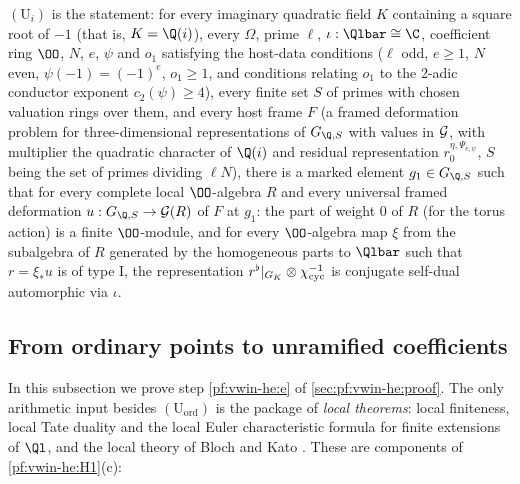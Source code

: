 \begin{definition}\label{pf:modularity:Ui}
$(\mathrm{U}_i)$ is the statement: for every imaginary quadratic field $K$ containing a square root of $-1$ (that is,
$K=\Q(i)$), every $\Omega$, prime $\ell$, $\iota:\Qlbar\cong\C$, coefficient ring $\OO$, $N$, $e$, $\psi$ and $o_1$
satisfying the host-data conditions ($\ell$ odd, $e\ge1$, $N$ even, $\psi(-1)=(-1)^e$, $o_1\ge1$, and conditions
relating $o_1$ to the $2$-adic conductor exponent $c_2(\psi)\ge4$), every finite set $S$ of primes with chosen
valuation rings over them, and every host frame $F$ (a framed deformation problem for three-dimensional
representations of $G_{\Q,S}$ with values in $\mathcal G$, with multiplier the quadratic character of $\Q(i)$ and
residual representation $r_0^{\eta,\Psi_{e,\psi}}$, $S$ being the set of primes dividing $\ell N$), there is a marked
element $g_1\in G_{\Q,S}$ such that for every
complete local $\OO$-algebra $R$ and every universal framed deformation $u:G_{\Q,S}\to\modularityG(R)$ of $F$ at $g_1$:
the part of weight $0$ of $R$ (for the torus action) is a finite $\OO$-module, and for every $\OO$-algebra map $\xi$
from the subalgebra of $R$ generated by the homogeneous parts to $\Qlbar$ such that $r=\xi_\ast u$ is of type I, the
representation $r^\flat|_{G_K}\otimes\chi_{\mathrm{cyc}}^{-1}$ is conjugate self-dual automorphic via $\iota$.
\end{definition}

\subsection{From ordinary points to unramified coefficients}\label{sec:pf:modularity:unr}

In this subsection we prove step \ref{pf:vwin-he:e} of \cref{sec:pf:vwin-he:proof}. The only arithmetic input besides
$(\mathrm{U}_{\mathrm{ord}})$ is the package of \emph{local theorems}: local finiteness, local Tate duality and the
local Euler characteristic formula for finite extensions of $\Ql$, and the local theory of Bloch and Kato
\cite{BlochKato1990}. These are components of \ref{pf:vwin-he:H1}(c):


